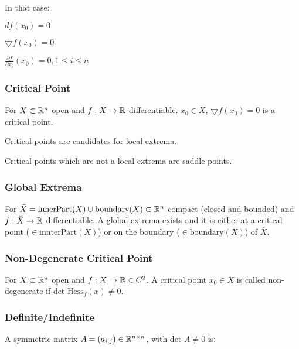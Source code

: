 In that case:
\begin{inparaitem}
    \item  $df(x_0) = 0$
    \item $\bigtriangledown f(x_0) = 0$
    \item $\frac{\partial f}{\partial x_i}(x_0) = 0, 1 \le i \le n$
\end{inparaitem}

\subsubsection{Critical Point}
For $X \subset \mathbb{R}^n$ open and $f: X \to \mathbb{R}$ differentiable. $x_0 \in X$, $\bigtriangledown f(x_0) = 0$ is a critical point.

\begin{compactitem}
    \item Critical points are candidates for local extrema.
    \item Critical points which are not a local extrema are saddle points.
\end{compactitem}

\subsubsection{Global Extrema}
For $\bar{X} = \text{innerPart}(X) \cup \text{boundary}(X) \subset \mathbb{R}^n$ compact (closed and bounded) and $f: \bar{X} \to \mathbb{R}$ differentiable. A global extrema exists and it is either at a critical point ($\in \text{innterPart}(X)$) or on the boundary ($\in \text{boundary}(X)$) of $\bar{X}$.

\subsubsection{Non-Degenerate Critical Point}
For $X \subset \mathbb{R}^n$ open and $f: X \to \mathbb{R} \in C^2$. A critical point $x_0 \in X$ is called non-degenerate if $\text{det }\text{Hess}_f(x) \neq 0$.

\subsubsection{Definite/Indefinite}
A symmetric matrix $A = (a_{i,j}) \in \mathbb{R}^{n \times n}$, with $\text{det } A \neq 0$ is:

